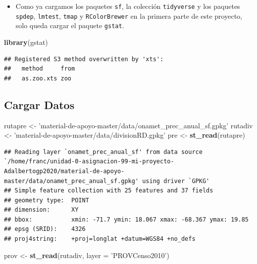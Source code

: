\documentclass[11pt,]{article}
\newenvironment{Shaded}{\begin{snugshade}}{\end{snugshade}}
\newcommand{\KeywordTok}[1]{\textcolor[rgb]{0.13,0.29,0.53}{\textbf{#1}}}
\newcommand{\DataTypeTok}[1]{\textcolor[rgb]{0.13,0.29,0.53}{#1}}
\newcommand{\StringTok}[1]{\textcolor[rgb]{0.31,0.60,0.02}{#1}}
\newcommand{\NormalTok}[1]{#1}
\providecommand{\tightlist}{%
\setlength{\itemsep}{0pt}\setlength{\parskip}{0pt}}
\begin{document}
\begin{itemize}
\tightlist
\item
  Como ya cargamos los paquetes \texttt{sf}, la colección
  \texttt{tidyverse} y los paquetes \texttt{spdep}, \texttt{lmtest},
  \texttt{tmap} y \texttt{RColorBrewer} en la primera parte de este
  proyecto, solo queda cargar el paquete \texttt{gstat}.
\end{itemize}

\begin{Shaded}
\begin{Highlighting}[]
\KeywordTok{library}\NormalTok{(gstat)}
\end{Highlighting}
\end{Shaded}

\begin{verbatim}
## Registered S3 method overwritten by 'xts':
##   method     from
##   as.zoo.xts zoo
\end{verbatim}

\subsection{Cargar Datos}\label{cargar-datos}

\begin{Shaded}
\begin{Highlighting}[]
\NormalTok{rutapre <-}\StringTok{ 'material-de-apoyo-master/data/onamet_prec_anual_sf.gpkg'}
\NormalTok{rutadiv <-}\StringTok{ 'material-de-apoyo-master/data/divisionRD.gpkg'}
\NormalTok{pre <-}\StringTok{ }\KeywordTok{st_read}\NormalTok{(rutapre)}
\end{Highlighting}
\end{Shaded}

\begin{verbatim}
## Reading layer `onamet_prec_anual_sf' from data source `/home/franc/unidad-0-asignacion-99-mi-proyecto-Adalbertogp2020/material-de-apoyo-master/data/onamet_prec_anual_sf.gpkg' using driver `GPKG'
## Simple feature collection with 25 features and 37 fields
## geometry type:  POINT
## dimension:      XY
## bbox:           xmin: -71.7 ymin: 18.067 xmax: -68.367 ymax: 19.85
## epsg (SRID):    4326
## proj4string:    +proj=longlat +datum=WGS84 +no_defs
\end{verbatim}

\begin{Shaded}
\begin{Highlighting}[]
\NormalTok{prov <-}\StringTok{ }\KeywordTok{st_read}\NormalTok{(rutadiv, }\DataTypeTok{layer =} \StringTok{'PROVCenso2010'}\NormalTok{)}
\end{Highlighting}
\end{Shaded}
\end{document}

